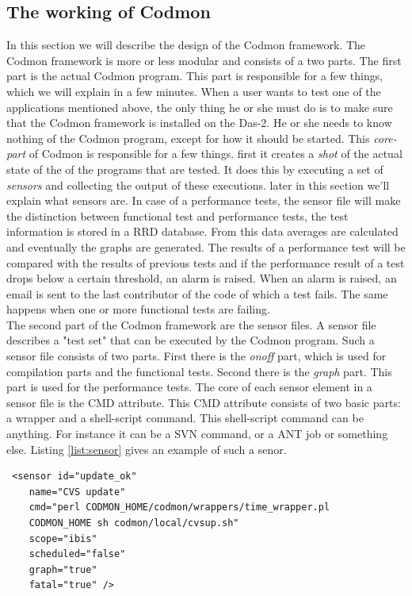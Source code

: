 \documentclass[a4paper,10pt]{scrartcl}
\begin{document}
\subsection{The working of Codmon}
\label{subsec:CodmonDesign}
In this section we will describe the design of the Codmon framework. The Codmon framework is more or less modular and consists of a two parts. The first part is the actual Codmon program. This part 
is responsible for a few things, which we will explain in a few minutes. When a user wants to test one of the applications mentioned above, the only thing he or she must do is to make sure that the Codmon 
framework is installed on the Das-2. He or she needs to know nothing of the Codmon program, except for how it should be started. This \emph{core-part} of Codmon is responsible for a few things. first
it creates a \emph{shot} of the actual state of the of the programs that are tested. It does this by executing a set of \emph{sensors} and collecting the output of these executions. later in this 
section we'll explain what sensors are. In case of a performance tests, the sensor file will make the distinction between functional test and performance tests, the test information is stored in 
a RRD database\cite{RRD}. From this data averages are calculated and eventually the graphs are generated\cite{Codmon}. The results of a performance test will be compared with the results of previous tests 
and if the performance result of a test drops below a certain threshold, an alarm is raised. When an alarm is raised, an email is sent to the last contributor of the code of which a test fails. 
The same happens when one or more functional tests are failing.\\

\noindent The second part of the Codmon framework are the sensor files. A sensor file describes a "test set" that can be executed by the Codmon program. Such a sensor file consists of two parts. 
First there is the \emph{onoff} part, which is used for compilation parts and the functional tests.  Second there is the \emph{graph} part. This part is used for the performance tests. 
The core of each sensor element in a sensor file is the CMD attribute. This CMD attribute consists of two basic parts: a wrapper and a shell-script command. This shell-script command can be anything. 
For instance it can be a SVN command, or a ANT job or something else. Listing \ref{list:sensor} gives an example of such a senor. \\

\begin{lstlisting}
 <sensor id="update_ok" 
    name="CVS update" 
    cmd="perl CODMON_HOME/codmon/wrappers/time_wrapper.pl 
    CODMON_HOME sh codmon/local/cvsup.sh" 
    scope="ibis" 
    scheduled="false" 
    graph="true" 
    fatal="true" />
\end{lstlisting}
 
\end{document}
